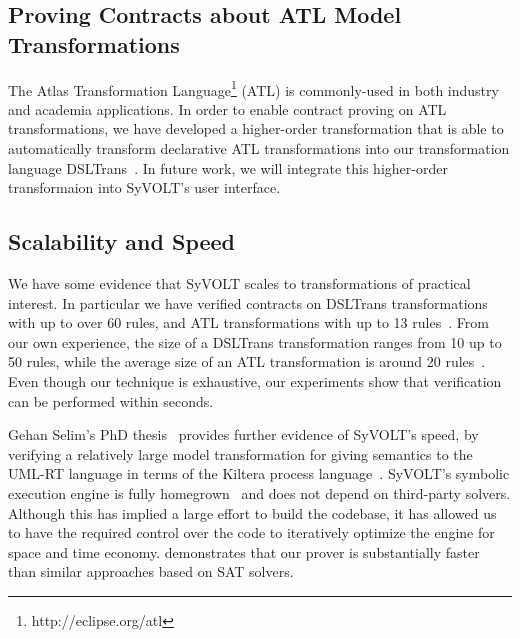 \subsection{Proving Contracts about ATL Model Transformations}
The Atlas Transformation Language\footnote{http://eclipse.org/atl} (ATL) is
commonly-used in both industry and academia applications. In order to enable contract proving on ATL transformations, we
have developed a higher-order transformation that is able to automatically
transform declarative ATL transformations into our transformation language
DSLTrans~\cite{Oakes}. In future work, we will integrate this higher-order transformaion into SyVOLT's user interface.

\subsection{Scalability and Speed}

We have some evidence that SyVOLT scales to transformations of practical
interest. In particular we have verified contracts on DSLTrans transformations with up to
over 60 rules, and ATL transformations with up to 13 rules~\cite{Oakes}. From our own
experience, the size of a DSLTrans transformation ranges from 10 up to 50 rules, while the average size of an ATL
transformation is around 20 rules~\cite{KuselSWRSK13}.
Even though our technique is exhaustive, our experiments show that verification can be performed within seconds.

Gehan Selim's PhD thesis~\cite{Selim2015} provides further evidence of SyVOLT's speed, by verifying a relatively large model transformation
for giving semantics to the UML-RT language in terms of the Kiltera process
language~\cite{PosseDingel2014}. SyVOLT's symbolic execution engine is fully
homegrown~\cite{LucioVang} and does not depend on third-party solvers. Although
this has implied a large effort to build the codebase, it has allowed us to
have the required control over the code to iteratively optimize the engine for
space and time economy.
\cite{Selim2014} demonstrates that our prover is substantially faster than
similar approaches based on SAT solvers.








